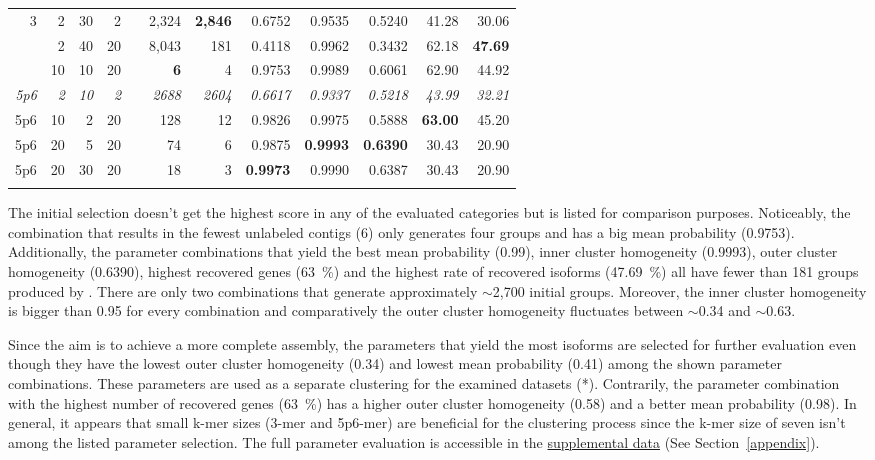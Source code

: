 \documentclass[12pt,a4paper,english]{article}
\begin{document}
\begin{table}[H]
{\begin{tabular}{rrrrrrrrrrrr}
				\midrule
				3 & 2 & 30 & 2 &  & 2,324 & \textbf{2,846} & 0.6752 & 0.9535 & 0.5240 & 41.28 & 30.06 \\ \addlinespace
				3 & 2 & 40 & 20 &  & 8,043 & 181 & 0.4118 & 0.9962 & 0.3432 & 62.18 & \textbf{47.69} \\ \addlinespace
				3 & 10 & 10 & 20 & & \textbf{6} & 4 & 0.9753 & 0.9989 & 0.6061 & 62.90 & 44.92 \\ \addlinespace
				\textit{5p6} & \textit{2} & \textit{10} & \textit{2} & & \textit{2688} & \textit{2604} & \textit{0.6617} & \textit{0.9337} & \textit{0.5218} & \textit{43.99} & \textit{32.21} \\ \addlinespace
				
				5p6 & 10 & 2 & 20 &  & 128 & 12 & 0.9826 & 0.9975 & 0.5888 & \textbf{63.00} & 45.20 \\ \addlinespace
				5p6 & 20 & 5 & 20 &  & 74 & 6 & 0.9875 & \textbf{0.9993} & \textbf{0.6390} & 30.43 & 20.90 \\ \addlinespace
				5p6 & 20 & 30 & 20 &  & 18 & 3 & \textbf{0.9973} & 0.9990 & 0.6387 & 30.43 & 20.90 \\ \addlinespace
				\bottomrule
			\end{tabular}%
		}
	\end{table}
	
    The initial selection doesn't get the highest score in any of the evaluated categories but is listed for comparison purposes.
	Noticeably, the combination that results in the fewest unlabeled contigs (6) only generates four groups and has a big mean probability (0.9753). Additionally, the parameter combinations that yield the best mean probability (0.99), inner cluster homogeneity (0.9993), outer cluster homogeneity (0.6390), highest recovered genes (63~\%) and the highest rate of recovered isoforms (47.69~\%) all have fewer than 181 groups produced by \hdbscan. There are only two combinations that generate approximately $\sim$2,700 initial groups. Moreover, the inner cluster homogeneity is bigger than 0.95 for every combination and comparatively the outer cluster homogeneity fluctuates between $\sim$0.34 and $\sim$0.63.
	
	Since the aim is to achieve a more complete assembly, the parameters that yield the most isoforms are selected for further evaluation even though they have the lowest outer cluster homogeneity (0.34) and lowest mean probability (0.41) among the shown parameter combinations. These parameters are used as a separate clustering for the examined datasets (\karma{}*).
	Contrarily, the parameter combination with the highest number of recovered genes (63~\%) has a higher outer cluster homogeneity (0.58) and a better mean probability (0.98).
	In general, it appears that small k-mer sizes (3-mer and 5p6-mer) are beneficial for the clustering process since the k-mer size of seven isn't among the listed parameter selection.
	The full parameter evaluation is accessible in the \href{https://github.com/lmfaber/master_thesis/tree/master/supplemental_data/parameter_evaluation}{supplemental data} (See Section~\ref{appendix}).
\end{document}

